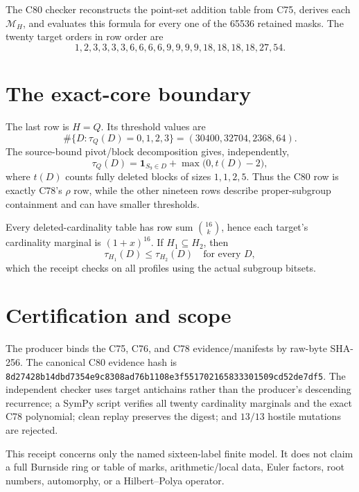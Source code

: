 \documentclass[10pt]{article}
\newcommand{\Q}{Q}
\begin{document}
The C80 checker reconstructs the point-set addition table from C75, derives
each $\mathcal M_H$, and evaluates this formula for every one of the 65536
retained masks.  The twenty target orders in row order are
\[
1,2,3,3,3,3,6,6,6,6,9,9,9,9,18,18,18,18,27,54.
\]

\section{The exact-core boundary}
The last row is $H=\Q$.  Its threshold values are
\[
\#\{D:\tau_\Q(D)=0,1,2,3\}
  =(30400,32704,2368,64).
\]
The source-bound pivot/block decomposition gives, independently,
\[
 \tau_\Q(D)=\mathbf1_{S_9\in D}+
 \max\bigl(0,t(D)-2\bigr),
\]
where $t(D)$ counts fully deleted blocks of sizes $1,1,2,5$.  Thus the C80
row is exactly C78's $\rho$ row, while the other nineteen rows describe
proper-subgroup containment and can have smaller thresholds.

Every deleted-cardinality table has row sum $\binom{16}{k}$, hence each
target's cardinality marginal is $(1+x)^{16}$.  If $H_1\subseteq H_2$, then
\[
 \tau_{H_1}(D)\leq\tau_{H_2}(D)\quad\text{for every }D,
\]
which the receipt checks on all profiles using the actual subgroup bitsets.

\section{Certification and scope}
The producer binds the C75, C76, and C78 evidence/manifests by raw-byte
SHA-256.  The canonical C80 evidence hash is
\texttt{8d27428b14dbd7354e9c8308ad76b1108e3f551702165833301509cd52de7df5}.
The independent checker uses target antichains rather than the producer's
descending recurrence; a SymPy script verifies all twenty cardinality
marginals and the exact C78 polynomial; clean replay preserves the digest;
and $13/13$ hostile mutations are rejected.

This receipt concerns only the named sixteen-label finite model.  It does not
claim a full Burnside ring or table of marks, arithmetic/local data, Euler
factors, root numbers, automorphy, or a Hilbert--Polya operator.
\end{document}
